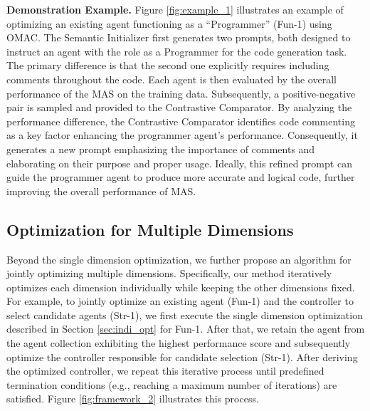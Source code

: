 \noindent \textbf{Demonstration Example.} Figure \ref{fig:example_1} illustrates an example of optimizing an existing agent functioning as a ``Programmer'' (Fun-1) using OMAC. The Semantic Initializer first generates two prompts, both designed to instruct an agent with the role as a Programmer for the code generation task. The primary difference is that the second one explicitly requires including comments throughout the code. Each agent is then evaluated by the overall performance of the MAS on the training data. Subsequently, a positive-negative pair is sampled and provided to the Contrastive Comparator. By analyzing the performance difference, the Contrastive Comparator identifies code commenting as a key factor enhancing the programmer agent’s performance. Consequently, it generates a new prompt emphasizing the importance of comments and elaborating on their purpose and proper usage. Ideally, this refined prompt can guide the programmer agent to produce more accurate and logical code, further improving the overall performance of MAS.





\subsection{Optimization for Multiple Dimensions}\label{sec:multi_dim}


Beyond the single dimension optimization, we further propose an algorithm for jointly optimizing multiple dimensions. Specifically, our method iteratively optimizes each dimension individually while keeping the other dimensions fixed. For example, to jointly optimize an existing agent (Fun-1) and the controller to select candidate agents (Str-1), we first execute the single dimension optimization described in Section \ref{sec:indi_opt} for Fun-1. After that, we retain the agent from the agent collection exhibiting the highest performance score and subsequently optimize the controller responsible for candidate selection (Str-1). After deriving the optimized controller, we repeat this iterative process until predefined termination conditions (e.g., reaching a maximum number of iterations) are satisfied. Figure \ref{fig:framework_2} illustrates this process.



